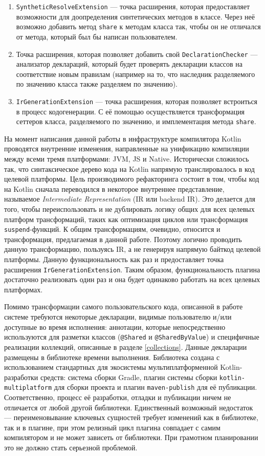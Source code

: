 \documentclass[specification,annotation,times]{itmo-student-thesis}
\begin{document}
\begin{enumerate}
	\item \texttt{SyntheticResolveExtension} --- точка расширения, которая предоставляет возможности для доопределения синтетических методов в классе. Через неё возможно добавить метод \texttt{share} к методам класса так, чтобы он не отличался от метода, который был бы написан пользователем.
	\item Точка расширения, которая позволяет добавить свой \texttt{DeclarationChecker} --- анализатор деклараций, который будет проверять декларации классов на соответствие новым правилам (например на то, что наследник разделяемого по значению класса также разделяем по значению).
	\item \texttt{IrGenerationExtension} --- точка расширения, которая позволяет встроиться в процесс кодогенерации. С её помощью осуществляется трансформация сеттеров класса, разделяемого по значению, и имплементация метода \texttt{share}.
\end{enumerate}

На момент написания данной работы в инфраструктуре компилятора Kotlin проводятся внутренние изменения, направленные на унификацию компиляции между всеми тремя платформами: JVM, JS и Native.
Исторически сложилось так, что синтаксическое дерево кода на Kotlin напрямую транслировалось в код целевой платформы.
Цель производимого рефакторинга состоит в том, чтобы код на Kotlin сначала переводился в некоторое внутреннее представление, называемое \textit{Intermediate Representation} (IR или backend IR).
Это делается для того, чтобы переиспользовать и не дублировать логику общих для всех целевых платформ трансформаций, таких как оптимизация циклов или трансформация \texttt{suspend}-функций.
К общим трансформациям, очевидно, относится и трансформация, предлагаемая в данной работе.
Поэтому логично проводить данную трансформацию, пользуясь IR, а не генерируя напрямую байткод целевой платформы.
Данную функциональность как раз и предоставляет точка расширения \texttt{IrGenerationExtension}. Таким образом, функциональность плагина достаточно реализовать один раз и она будет одинаково работать на всех целевых платформах.

Помимо трансформации самого пользовательского кода, описанной в работе системе требуются некоторые декларации, видимые пользователю и/или доступные во время исполнения: аннотации, которые непосредственно используются для разметки классов (\texttt{@Shared} и \texttt{@SharedByValue}) и специфичные реализации коллекций, описанные в разделе \ref{collections}.
Данные декларации размещены в библиотеке времени выполнения. Библиотека создана с использованием стандартных для экосистемы мультиплатформенной Kotlin-разработки средств: система сборки Gradle, плагин системы сборки \texttt{kotlin-multiplatform} для сборки проекта и плагин \texttt{maven-publish} для её публикации.
Соответственно, процесс её разработки, отладки и публикации ничем не отличается от любой другой библиотеки.
Единственный возможный недостаток --- переименовывание ключевых сущностей требует изменений как в библиотеке, так и в плагине, при этом релизный цикл плагина совпадает с самим компилятором и не может зависеть от библиотеки. При грамотном планировании это не должно стать серьезной проблемой.
\end{document}
